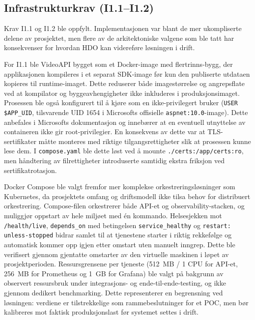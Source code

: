 \subsection{Infrastrukturkrav (I1.1--I1.2)}
\label{sec:eval-infrastruktur}


Krav I1.1 og I1.2 ble oppfylt. Implementasjonen var blant de mer ukompliserte delene av prosjektet, men flere av de arkitektoniske valgene som ble tatt har konsekvenser for hvordan HDO kan videreføre løsningen i drift.

For I1.1 ble VideoAPI bygget som et Docker-image med flertrinns-bygg, der applikasjonen kompileres i et separat SDK-image før kun den publiserte utdataen kopieres til runtime-imaget. Dette reduserer både imagestørrelse og angrepsflate ved at kompilator og byggeavhengigheter ikke inkluderes i produksjonsimaget. Prosessen ble også konfigurert til å kjøre som en ikke-privilegert bruker (\texttt{USER \$APP\_UID}, tilsvarende UID 1654 i Microsofts offisielle \texttt{aspnet:10.0}-image). Dette anbefales i Microsofts dokumentasjon \cite{aspnet_rootless} og innebærer at en eventuell utnyttelse av containeren ikke gir root-privilegier. En konsekvens av dette var at TLS-sertifikater måtte monteres med riktige tilgangsrettigheter slik at prosessen kunne lese dem. I \texttt{compose.yaml} ble dette løst ved å mounte \texttt{./certs:/app/certs:ro}, men håndtering av filrettigheter introduserte samtidig ekstra friksjon ved sertifikatrotasjon.

Docker Compose ble valgt fremfor mer komplekse orkestreringsløsninger som Kubernetes, da prosjektets omfang og driftsmodell ikke tilsa behov for distribuert orkestrering. Compose-filen orkestrerer både API-et og observability-stacken, og muliggjør oppstart av hele miljøet med én kommando. Helsesjekken mot \texttt{/health/live}, \texttt{depends\_on} med betingelsen \texttt{service\_healthy} og \texttt{restart: unless-stopped} bidrar samlet til at tjenestene starter i riktig rekkefølge og automatisk kommer opp igjen etter omstart uten manuelt inngrep. Dette ble verifisert gjennom gjentatte omstarter av den virtuelle maskinen i løpet av prosjektperioden. Ressursgrensene per tjeneste (512~MB / 1 CPU for API-et, 256~MB for Prometheus og 1~GB for Grafana) ble valgt på bakgrunn av observert ressursbruk under integrasjons- og ende-til-ende-testing, og ikke gjennom dedikert benchmarking. Dette representerer en begrensning ved løsningen: verdiene er tilstrekkelige som rammebeslutninger for et POC, men bør kalibreres mot faktisk produksjonslast før systemet settes i drift.

